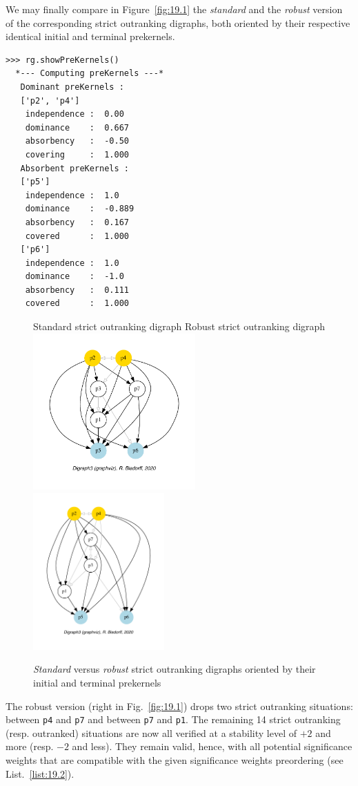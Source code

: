 We may finally compare in Figure~\vref{fig:19.1} the \emph{standard} and the \emph{robust} version of the corresponding strict outranking digraphs, both oriented by their respective identical initial and terminal prekernels.
\begin{lstlisting}
>>> rg.showPreKernels()
  *--- Computing preKernels ---*
   Dominant preKernels :
   ['p2', 'p4']
    independence :  0.00
    dominance    :  0.667
    absorbency   :  -0.50
    covering     :  1.000
   Absorbent preKernels :
   ['p5']
    independence :  1.0
    dominance    :  -0.889
    absorbency   :  0.167
    covered      :  1.000
   ['p6']
    independence :  1.0
    dominance    :  -1.0
    absorbency   :  0.111
    covered      :  1.000
\end{lstlisting}
\begin{figure}[ht]
  Standard strict outranking digraph \hfill Robust strict outranking digraph \\
  \includegraphics[height=6cm]{Figures/19-1-stdg.pdf}\hfill
  \includegraphics[height=6cm]{Figures/19-1-robg.pdf}
\caption{\emph{Standard} versus \emph{robust} strict outranking digraphs oriented by their initial and terminal prekernels} 
\label{fig:19.1}       %
\end{figure}
   
The robust version (right in Fig.~\vref{fig:19.1}) drops two strict outranking situations: between \texttt{p4} and \texttt{p7} and between \texttt{p7} and \texttt{p1}. The remaining 14 strict outranking (resp. outranked) situations are now all verified at a stability level of $+2$ and more (resp. $-2$ and less). They remain valid, hence, with all potential significance weights that are compatible with the given significance weights preordering (see List.~\vref{list:19.2}).

